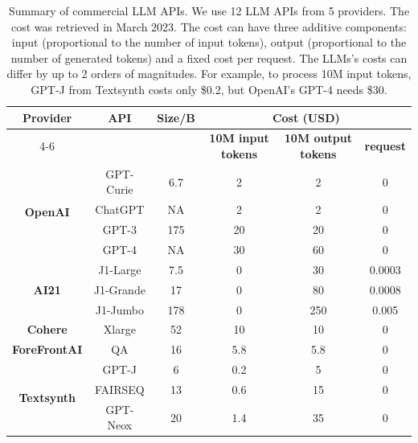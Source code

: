 \documentclass{article}
\begin{document}
\begin{table}[htbp]
  \centering
  \small
  \caption{Summary of commercial LLM APIs. We use 12 LLM APIs from 5 providers. The cost was retrieved in March 2023. The cost can have three additive components: input (proportional to the number of input tokens), output (proportional to the number of generated tokens) and a fixed cost per request. The LLMs's costs can differ by up to 2 orders of magnitudes. For example, to process 10M input tokens, GPT-J from Textsynth costs only \$0.2, but OpenAI's GPT-4 needs \$30.}
    \begin{tabular}{|c|c|c|c|c|c|}
    \hline
    \multirow{2}[4]{*}{\textbf{Provider}} &
      \multirow{2}[4]{*}{\textbf{API}} &
      \multicolumn{1}{c|}{\multirow{2}[4]{*}{\textbf{Size/B}}} &
      \multicolumn{3}{c|}{\textbf{Cost (USD)}}
      \bigstrut\\
\cline{4-6}    \multicolumn{1}{|c|}{} &
      \multicolumn{1}{c|}{} &
       &
      \multicolumn{1}{c|}{\textbf{10M input tokens}} &
      \multicolumn{1}{c|}{\textbf{10M output tokens}} &
      \multicolumn{1}{c|}{\textbf{ request}}
      \bigstrut\\
    \hline
    \hline
    \multirow{4}[8]{*}{\textbf{OpenAI}} &
      GPT-Curie &
      6.7 &
      2 &
      2 &
      0
      \bigstrut\\
\cline{2-6}    \multicolumn{1}{|c|}{} &
      ChatGPT &
      \multicolumn{1}{c|}{NA} &
      2 &
      2 &
      0
      \bigstrut\\
\cline{2-6}    \multicolumn{1}{|c|}{} &
      GPT-3 &
      175 &
      20 &
      20 &
      0
      \bigstrut\\
\cline{2-6}    \multicolumn{1}{|c|}{} &
      GPT-4 &
      \multicolumn{1}{c|}{NA} &
      30 &
      60 &
      0
      \bigstrut\\
    \hline
    \hline
    \multirow{3}[6]{*}{\textbf{AI21}} &
      J1-Large &
      7.5 &
      0 &
      30 &
      0.0003
      \bigstrut\\
\cline{2-6}    \multicolumn{1}{|c|}{} &
      J1-Grande &
      17 &
      0 &
      80 &
      0.0008
      \bigstrut\\
\cline{2-6}    \multicolumn{1}{|c|}{} &
      J1-Jumbo &
      178 &
      0 &
      250 &
      0.005
      \bigstrut\\
    \hline
    \hline
    \textbf{Cohere} &
      Xlarge &
      52 &
      10 &
      10 &
      0
      \bigstrut\\
    \hline      
    \hline
    \textbf{ForeFrontAI} &
      QA &
      16 &
      5.8 &
      5.8 &
      0
      \bigstrut\\
    \hline      
    \hline
    \multirow{3}[6]{*}{\textbf{Textsynth}} &
      GPT-J &
      6 &
      0.2 &
      5 &
      0
      \bigstrut\\
\cline{2-6}    \multicolumn{1}{|c|}{} &
      FAIRSEQ &
      13 &
      0.6 &
      15 &
      0
      \bigstrut\\
\cline{2-6}    \multicolumn{1}{|c|}{} &
      GPT-Neox &
      20 &
      1.4 &
      35 &
      0
      \bigstrut\\
    \hline
    \end{tabular}%
  \label{tab:AML:LLMAPIs}%
\end{table}%
\end{document}
